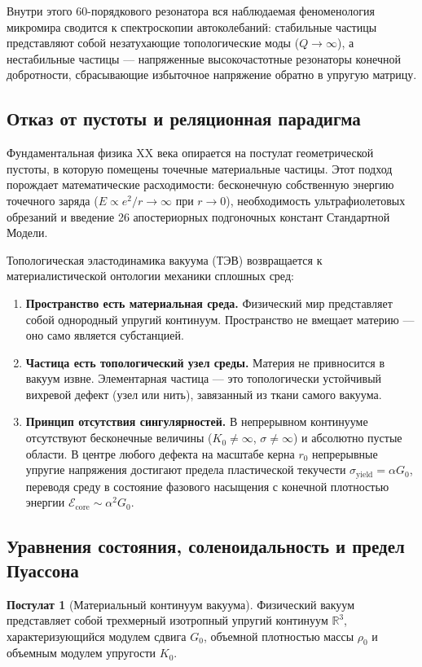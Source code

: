 \documentclass[11pt,a4paper]{article}
\theoremstyle{definition}
\newtheorem{postulate}{Постулат}
\theoremstyle{remark}
\begin{document}
Внутри этого 60-порядкового резонатора вся наблюдаемая феноменология микромира сводится к спектроскопии автоколебаний: стабильные частицы представляют собой незатухающие топологические моды ($Q \to \infty$), а нестабильные частицы --- напряженные высокочастотные резонаторы конечной добротности, сбрасывающие избыточное напряжение обратно в упругую матрицу.

\subsection{Отказ от пустоты и реляционная парадигма}
Фундаментальная физика XX века опирается на постулат геометрической пустоты, в которую помещены точечные материальные частицы. Этот подход порождает математические расходимости: бесконечную собственную энергию точечного заряда ($E \propto e^2/r \to \infty$ при $r \to 0$), необходимость ультрафиолетовых обрезаний и введение 26 апостериорных подгоночных констант Стандартной Модели.
	
Топологическая эластодинамика вакуума (ТЭВ) возвращается к материалистической онтологии механики сплошных сред:
\begin{enumerate}
\item \textbf{Пространство есть материальная среда.} Физический мир представляет собой однородный упругий континуум. Пространство не вмещает материю — оно само является субстанцией.
\item \textbf{Частица есть топологический узел среды.} Материя не привносится в вакуум извне. Элементарная частица — это топологически устойчивый вихревой дефект (узел или нить), завязанный из ткани самого вакуума.
\item \textbf{Принцип отсутствия сингулярностей.} В непрерывном континууме отсутствуют бесконечные величины ($K_0 \ne \infty$, $\sigma \ne \infty$) и абсолютно пустые области. В центре любого дефекта на масштабе керна $r_0$ непрерывные упругие напряжения достигают предела пластической текучести $\sigma_{\mathrm{yield}} = \alpha G_0$, переводя среду в состояние фазового насыщения с конечной плотностью энергии $\mathcal{E}_{\mathrm{core}} \sim \alpha^2 G_0$.
\end{enumerate}
	
\subsection{Уравнения состояния, соленоидальность и предел Пуассона}
	
\begin{postulate}[Материальный континуум вакуума]
	Физический вакуум представляет собой трехмерный изотропный упругий континуум $\mathbb{R}^3$, характеризующийся модулем сдвига $G_0$, объемной плотностью массы $\rho_0$ и объемным модулем упругости $K_0$.
\end{postulate}
	
\end{document}
